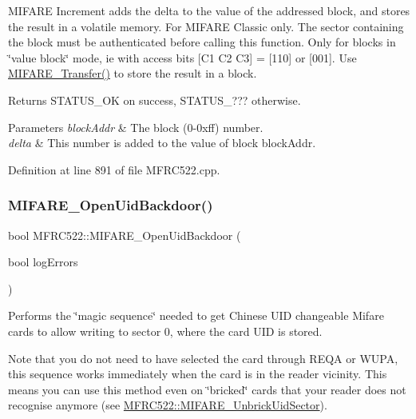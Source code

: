 M\+I\+F\+A\+RE Increment adds the delta to the value of the addressed block, and stores the result in a volatile memory. For M\+I\+F\+A\+RE Classic only. The sector containing the block must be authenticated before calling this function. Only for blocks in \char`\"{}value block\char`\"{} mode, ie with access bits \mbox{[}C1 C2 C3\mbox{]} = \mbox{[}110\mbox{]} or \mbox{[}001\mbox{]}. Use \hyperlink{class_m_f_r_c522_a36299391c708a71c11c48a94c4e3f3c2}{M\+I\+F\+A\+R\+E\+\_\+\+Transfer()} to store the result in a block.

\begin{DoxyReturn}{Returns}
S\+T\+A\+T\+U\+S\+\_\+\+OK on success, S\+T\+A\+T\+U\+S\+\_\+??? otherwise. 
\end{DoxyReturn}

\begin{DoxyParams}{Parameters}
{\em block\+Addr} & The block (0-\/0xff) number. \\
\hline
{\em delta} & This number is added to the value of block block\+Addr. \\
\hline
\end{DoxyParams}


Definition at line 891 of file M\+F\+R\+C522.\+cpp.

\mbox{\label{class_m_f_r_c522_a925607adc9382720c222578bd236a9c8}} 
\subsubsection{\texorpdfstring{M\+I\+F\+A\+R\+E\+\_\+\+Open\+Uid\+Backdoor()}{MIFARE\_OpenUidBackdoor()}}
{\footnotesize\ttfamily bool M\+F\+R\+C522\+::\+M\+I\+F\+A\+R\+E\+\_\+\+Open\+Uid\+Backdoor (\begin{DoxyParamCaption}\item[{bool}]{log\+Errors }\end{DoxyParamCaption})}

Performs the \char`\"{}magic sequence\char`\"{} needed to get Chinese U\+ID changeable Mifare cards to allow writing to sector 0, where the card U\+ID is stored.

Note that you do not need to have selected the card through R\+E\+QA or W\+U\+PA, this sequence works immediately when the card is in the reader vicinity. This means you can use this method even on \char`\"{}bricked\char`\"{} cards that your reader does not recognise anymore (see \hyperlink{class_m_f_r_c522_afcbb15d925cb3bea9f58595111fbca48}{M\+F\+R\+C522\+::\+M\+I\+F\+A\+R\+E\+\_\+\+Unbrick\+Uid\+Sector}).

